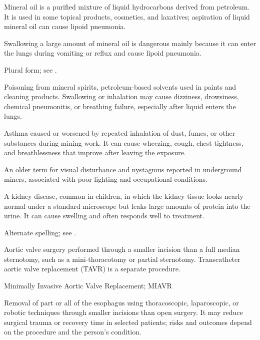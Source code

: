  Mineral oil is a purified mixture of liquid hydrocarbons derived from petroleum. It is used in some topical products, cosmetics, and laxatives; aspiration of liquid mineral oil can cause lipoid pneumonia.

 Swallowing a large amount of mineral oil is dangerous mainly because it can enter the lungs during vomiting or reflux and cause lipoid pneumonia.

 Plural form; see .

 Poisoning from mineral spirits, petroleum-based solvents used in paints and cleaning products. Swallowing or inhalation may cause dizziness, drowsiness, chemical pneumonitis, or breathing failure, especially after liquid enters the lungs.

 Asthma caused or worsened by repeated inhalation of dust, fumes, or other substances during mining work. It can cause wheezing, cough, chest tightness, and breathlessness that improve after leaving the exposure.

 An older term for visual disturbance and nystagmus reported in underground miners, associated with poor lighting and occupational conditions.

 A kidney disease, common in children, in which the kidney tissue looks nearly normal under a standard microscope but leaks large amounts of protein into the urine. It can cause swelling and often responds well to treatment.

 Alternate spelling; see .

 Aortic valve surgery performed through a smaller incision than a full median sternotomy, such as a mini-thoracotomy or partial sternotomy. Transcatheter aortic valve replacement (TAVR) is a separate procedure.

\synonyms
Minimally Invasive Aortic Valve Replacement; MIAVR

 Removal of part or all of the esophagus using thoracoscopic, laparoscopic, or robotic techniques through smaller incisions than open surgery. It may reduce surgical trauma or recovery time in selected patients; risks and outcomes depend on the procedure and the person's condition.

